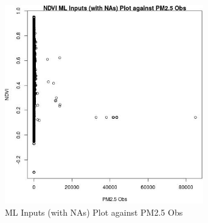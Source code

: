 \begin{figure} 
\centering  
\includegraphics[width=0.77\textwidth]{Code_Outputs/Report_ML_input_PM25_Step4_part_f_de_duplicated_aveswNAs_NDVIvPM25_Obs.jpg} 
\caption{\label{fig:Report_ML_input_PM25_Step4_part_f_de_duplicated_aveswNAsNDVIvPM25_Obs}ML Inputs (with NAs) Plot against PM2.5 Obs} 
\end{figure} 
 
